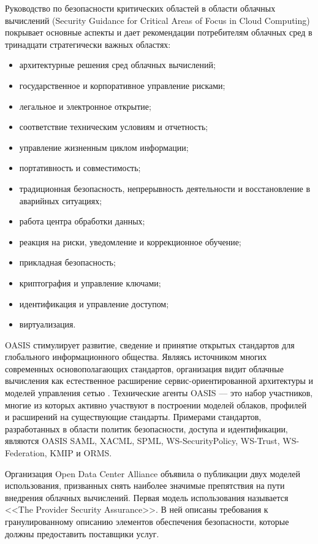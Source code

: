 Руководство по безопасности критических областей в области облачных вычислений (Security Guidance for Critical Areas of Focus in Cloud Computing) покрывает основные аспекты и дает рекомендации потребителям облачных сред в тринадцати стратегически важных областях:
\begin{itemize}
  \item архитектурные решения сред облачных вычислений;
  \item государственное и корпоративное управление рисками;
  \item легальное и электронное открытие;
  \item соответствие техническим условиям и отчетность;
  \item управление жизненным циклом информации;
  \item портативность и совместимость;
  \item традиционная безопасность, непрерывность деятельности и восстановление в аварийных ситуациях;
  \item работа центра обработки данных;
  \item реакция на риски, уведомление и коррекционное обучение;
  \item прикладная безопасность;
  \item криптография и управление ключами;
  \item идентификация и управление доступом;
  \item виртуализация.
\end{itemize}

OASIS стимулирует развитие, сведение и принятие открытых стандартов для глобального информационного общества. Являясь источником многих современных основополагающих стандартов, организация видит облачные вычисления как естественное расширение сервис-ориентированной архитектуры и моделей управления сетью \cite{psta}.
Технические агенты OASIS –– это набор участников, многие из которых активно участвуют в построении моделей облаков, профилей и расширений на существующие стандарты.
Примерами стандартов, разработанных в области политик безопасности, доступа и идентификации, являются OASIS SAML, XACML, SPML, WS-SecurityPolicy, WS-Trust, WS-Federation, KMIP и ORMS.

Организация Open Data Center Alliance объявила о публикации двух моделей использования, призванных снять наиболее значимые препятствия на пути внедрения облачных вычислений.
Первая модель использования называется <<The Provider Security Assurance>>.
В ней описаны требования к гранулированному описанию элементов обеспечения безопасности, которые должны предоставить поставщики услуг.

